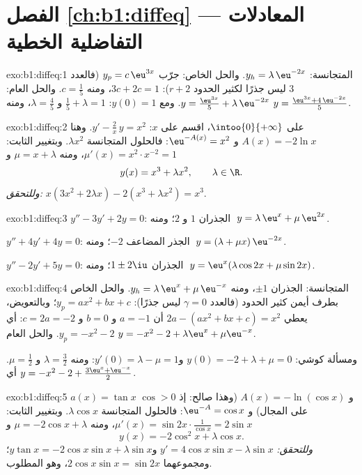 \section*{الفصل \ref{ch:b1:diffeq} --- المعادلات التفاضلية الخطية}

\begin{solution}{exo:b1:diffeq:1}
المتجانسة: $y_h = \lambda\,\eu^{-2x}$. والحل الخاص: جرّب $y_p =
c\,\eu^{3x}$ (فالعدد $3$ ليس جذرًا لكثير الحدود $r + 2$): $3c + 2c = 1$، ومنه $c =
\frac15$. والحل العام: $y = \frac{\eu^{3x}}{5} +
\lambda\,\eu^{-2x}$. ومع $y(0) = 1$: $\frac15 + \lambda = 1$ و
$\lambda = \frac45$، ومنه $y = \frac{\eu^{3x} + 4\,\eu^{-2x}}{5}$.
\end{solution}

\begin{solution}{exo:b1:diffeq:2}
على $\intoo{0}{+\infty}$، اقسم على $x$: $y' - \frac{2}{x}\,y = x^2$.
وهنا $A(x) = -2\ln x$ و $\eu^{-A(x)} = x^2$: فالحلول المتجانسة
$\lambda x^2$. وبتغيير الثابت: $\mu'(x) = x^2 \cdot x^{-2} =
1$، ومنه $\mu = x + \lambda$ و
\[
y(x) = x^3 + \lambda x^2, \qquad \lambda \in \R .
\]
\emph{وللتحقق:} $x(3x^2 + 2\lambda x) - 2(x^3 + \lambda x^2) = x^3$.
\end{solution}

\begin{solution}{exo:b1:diffeq:3}
$y'' - 3y' + 2y = 0$: الجذران $1$ و $2$؛ ومنه $\;y = \lambda\,\eu^{x} +
\mu\,\eu^{2x}$.

$y'' + 4y' + 4y = 0$: الجذر المضاعف $-2$؛ ومنه $\;y = (\lambda + \mu
x)\,\eu^{-2x}$.

$y'' - 2y' + 5y = 0$: الجذران $1 \pm 2\iu$؛ ومنه $\;y = \eu^{x}(\lambda\cos
2x + \mu\sin 2x)$.
\end{solution}

\begin{solution}{exo:b1:diffeq:4}
المتجانسة: الجذران $\pm 1$، ومنه $y_h = \lambda\,\eu^x + \mu\,\eu^{-x}$.
والحل الخاص بطرف أيمن كثير الحدود (فالعدد $\gamma = 0$ ليس جذرًا):
$y_p = ax^2 + bx + c$؛ وبالتعويض، يعطي $2a - (ax^2 + bx + c) = x^2$
أن $a = -1$ و $b = 0$ و $c = 2a = -2$: أي $y_p = -x^2 - 2$. والحل
العام $y = -x^2 - 2 + \lambda\eu^x + \mu\eu^{-x}$.

ومسألة كوشي: $y(0) = -2 + \lambda + \mu = 0$ و$y'(0) = \lambda - \mu =
1$: ومنه $\lambda = \frac32$ و $\mu = \frac12$. أي
$y = -x^2 - 2 + \frac{3\eu^x + \eu^{-x}}{2}$.
\end{solution}

\begin{solution}{exo:b1:diffeq:5}
$a(x) = \tan x$ و $A(x) = -\ln(\cos x)$ (وهذا صالح: إذ $\cos > 0$ على المجال) و $\eu^{-A} = \cos x$: فالحلول المتجانسة $\lambda\cos x$.
وبتغيير الثابت: $\mu'(x) = \sin 2x \cdot \frac{1}{\cos x} =
2\sin x$، ومنه $\mu = -2\cos x + \lambda$ و
\[
y(x) = -2\cos^2 x + \lambda \cos x .
\]
\emph{وللتحقق:} $y' = 4\cos x \sin x - \lambda\sin x$ و$y\tan x =
-2\cos x\sin x + \lambda \sin x$؛ ومجموعهما $2\cos x\sin x =
\sin 2x$، وهو المطلوب.
\end{solution}

